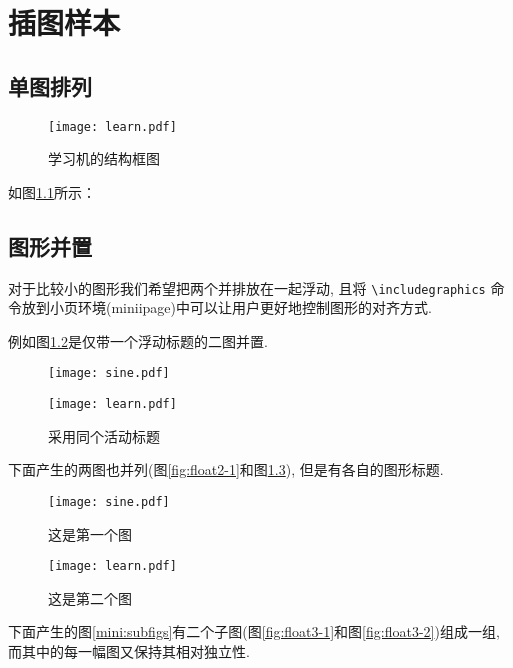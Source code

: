 \chapter{插图样本}
\setcounter{subsubsection}{0} %
\section{单图排列 \label{chap5:figure1}}
\begin{figure}[ht]
\centering
\texttt{[image: learn.pdf]}
\caption{学习机的结构框图} \label{fig:7-1}
\end{figure}
如图\ref{fig:7-1}所示：
\section{图形并置 \label{chap5:figure2}}
对于比较小的图形我们希望把两个并排放在一起浮动, 且将 \verb/\includegraphics/
命令放到小页环境(miniipage)中可以让用户更好地控制图形的对齐方式.

例如图\ref{fig:7-2}是仅带一个浮动标题的二图并置.
\begin{figure}[ht]
  \centering
  \begin{minipage}[c]{0.5\textwidth}
    \centering
    \texttt{[image: sine.pdf]}
  \end{minipage}%
  \begin{minipage}[c]{0.5\textwidth}
    \centering
    \texttt{[image: learn.pdf]}
  \end{minipage}
  \caption{采用同个活动标题\label{fig:7-2}}
\end{figure}


下面产生的两图也并列(图\ref{fig:float2-1}和图\ref{fig:float2-2}), 但是有各自的图形标题.
\begin{figure}[ht]
\begin{minipage}[t]{0.45\linewidth}
\centering
\texttt{[image: sine.pdf]}
\caption{这是第一个图\label{fig:float2-1}}
\end{minipage}%
\hfill
\begin{minipage}[t]{0.5\linewidth}
\centering
\texttt{[image: learn.pdf]}
\caption{这是第二个图\label{fig:float2-2}}
\end{minipage}
\end{figure}


下面产生的图\ref{mini:subfigs}有二个子图(图\ref{fig:float3-1}和图\ref{fig:float3-2})组成一组,
而其中的每一幅图又保持其相对独立性.

